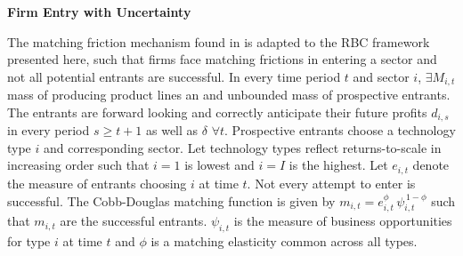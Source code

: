 \documentclass[a4paper,12pt]{article} %
\numberwithin{equation}{section} %
\numberwithin{figure}{section}
\numberwithin{table}{section}
\begin{document}
\medskip
\medskip
\noindent\textbf{Firm Entry with Uncertainty}
\medskip

The matching friction mechanism found in \textcite{sedlavcek2017growth} is adapted to the RBC framework presented here, such that firms face matching 
frictions in entering a sector and not all potential entrants are successful. In every time period $t$ and sector $i$, $\exists M_{i,t}$ mass of 
producing product lines an and unbounded mass of prospective entrants. The entrants are forward looking and correctly anticipate their future 
profits $d_{i,s}$ in every period $s\ge t+1$ as well as $\delta$ $\forall t$. Prospective entrants choose a technology type $i$ and corresponding sector.
Let technology types reflect returns-to-scale in increasing order such that $i = 1$ is lowest and $i = I$ is the highest. 
Let $e_{i,t}$ denote the measure of entrants choosing $i$ at time $t$. Not every attempt to enter is successful. The Cobb-Douglas  matching function 
is given by $m_{i,t}= e_{i,t}^{\phi}\,\psi_{i,t}^{\,1-\phi}$ such that $m_{i,t}$ are the successful entrants. $\psi_{i,t}$ is the measure of 
business opportunities for type $i$ at time $t$ and $\phi$ is a matching elasticity common across all types. 
\end{document}
